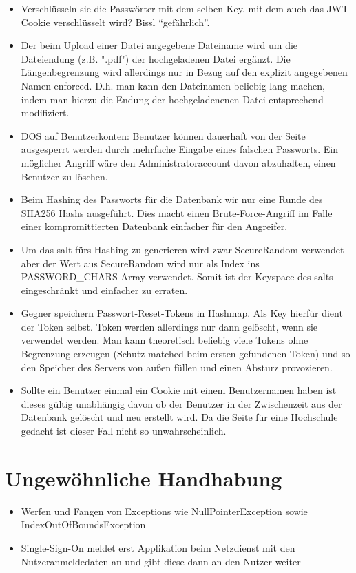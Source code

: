 \documentclass[12pt,DIV14,BCOR10mm,a4paper,parskip=half-,headsepline,headinclude,english,ngerman,bibliography=totocnumbered]{scrreprt}
\begin{document}
\begin{itemize}
  \item Verschlüsseln sie die Passwörter mit dem selben Key, mit dem auch das JWT Cookie verschlüsselt wird? Bissl \enquote{gefährlich}.
  \item Der beim Upload einer Datei angegebene Dateiname wird um die Dateiendung (z.B. ".pdf") der hochgeladenen Datei ergänzt. Die Längenbegrenzung wird allerdings nur in Bezug auf den explizit angegebenen Namen enforced. D.h. man kann den Dateinamen beliebig lang machen, indem man hierzu die Endung der hochgeladenenen Datei entsprechend modifiziert.
  \item DOS auf Benutzerkonten: Benutzer können dauerhaft von der Seite ausgesperrt werden durch mehrfache Eingabe eines falschen Passworts. Ein möglicher Angriff wäre den Administratoraccount davon abzuhalten, einen Benutzer zu löschen.
  \item Beim Hashing des Passworts für die Datenbank wir nur eine Runde des SHA256 Hashs ausgeführt. Dies macht einen Brute-Force-Angriff im Falle einer kompromittierten Datenbank einfacher für den Angreifer.
  \item Um das salt fürs Hashing zu generieren wird zwar SecureRandom verwendet aber der Wert aus SecureRandom wird nur als Index ins PASSWORD\_CHARS Array verwendet. Somit ist der Keyspace des salts eingeschränkt und einfacher zu erraten.
  \item Gegner speichern Passwort-Reset-Tokens in Hashmap. Als Key hierfür dient der Token selbst. Token werden allerdings nur dann gelöscht, wenn sie verwendet werden. Man kann theoretisch beliebig viele Tokens ohne Begrenzung erzeugen (Schutz matched beim ersten gefundenen Token) und so den Speicher des Servers von außen füllen und einen Absturz provozieren.
  \item Sollte ein Benutzer einmal ein Cookie mit einem Benutzernamen haben ist dieses gültig unabhängig davon ob der Benutzer in der Zwischenzeit aus der Datenbank gelöscht und neu erstellt wird. Da die Seite für eine Hochschule gedacht ist dieser Fall nicht so unwahrscheinlich.
\end{itemize}

\chapter{Ungewöhnliche Handhabung}

\begin{itemize}
  \item Werfen und Fangen von Exceptions wie NullPointerException sowie IndexOutOfBoundsException
  \item Single-Sign-On meldet erst Applikation beim Netzdienst mit den Nutzeranmeldedaten an und gibt diese dann an den Nutzer weiter
\end{itemize}
\end{document}
